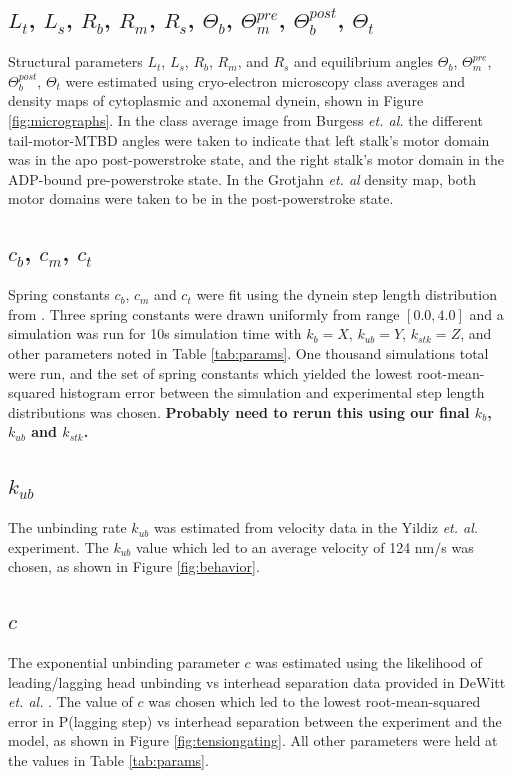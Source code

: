 \documentclass[9pt,twocolumn,twoside]{article}
\begin{document}
\subsection*{$L_t$, $L_s$, $R_b$, $R_m$, $R_s$, $\Theta_{b}$, $\Theta_{m}^{pre}$, $\Theta_{b}^{post}$, $\Theta_{t}$}
Structural parameters $L_t$, $L_s$, $R_b$, $R_m$, and $R_s$ and equilibrium angles $\Theta_{b}$, $\Theta_{m}^{pre}$, $\Theta_{b}^{post}$, $\Theta_{t}$ were estimated using cryo-electron microscopy class averages and density maps of cytoplasmic and axonemal dynein, shown in Figure \ref{fig:micrographs}. In the class average image from Burgess \textit{et. al.} \cite{burgess} the different tail-motor-MTBD angles were taken to indicate that left stalk's motor domain was in the apo post-powerstroke state, and the right stalk's motor domain in the ADP-bound pre-powerstroke state. In the Grotjahn \textit{et. al} \cite{grotjahn} density map, both motor domains were taken to be in the post-powerstroke state.

\subsection*{$c_b$, $c_m$, $c_t$}
Spring constants $c_b$, $c_m$ and $c_t$ were fit using the dynein step length distribution from \cite{yildizpaper}. Three spring constants were drawn uniformly from range $[0.0, 4.0]$ and a simulation was run for 10s simulation time with $k_b=X$, $k_{ub}=Y$, $k_{stk}=Z$, and other parameters noted in Table \ref{tab:params}. One thousand simulations total were run, and the set of spring constants which yielded the lowest root-mean-squared histogram error between the simulation and experimental step length distributions was chosen. \textbf{Probably need to rerun this using our final $k_b$, $k_{ub}$ and $k_{stk}$.}

\subsection*{$k_{ub}$}
The unbinding rate $k_{ub}$ was estimated from velocity data in the Yildiz \textit{et. al.} experiment. The $k_{ub}$ value which led to an average velocity of 124 nm/s was chosen, as shown in Figure \ref{fig:behavior}.

\subsection*{$c$}
The exponential unbinding parameter $c$ was estimated using the likelihood of leading/lagging head unbinding vs interhead separation data provided in DeWitt \textit{et. al.} \cite{dewitt}. The value of $c$ was chosen which led to the lowest root-mean-squared error in P(lagging step) vs interhead separation between the experiment and the model, as shown in Figure \ref{fig:tensiongating}. All other parameters were held at the values in Table \ref{tab:params}.
\end{document}
